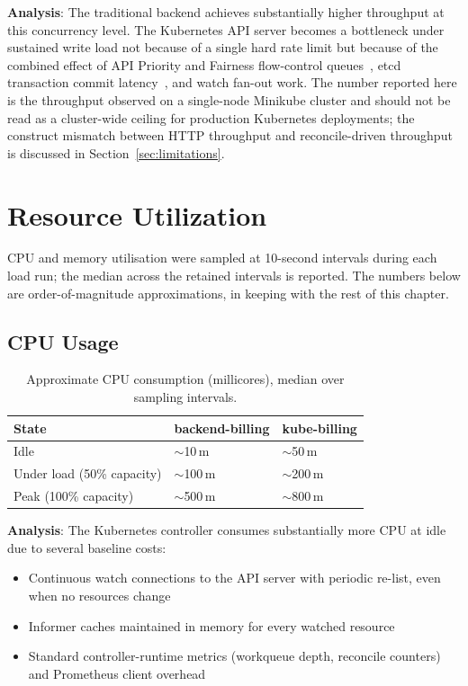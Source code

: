 \textbf{Analysis}: The traditional backend achieves substantially higher throughput at this concurrency level. The Kubernetes API server becomes a bottleneck under sustained write load not because of a single hard rate limit but because of the combined effect of API Priority and Fairness flow-control queues~\cite{k8s_apf}, etcd transaction commit latency~\cite{etcd_impact}, and watch fan-out work. The number reported here is the throughput observed on a single-node Minikube cluster and should not be read as a cluster-wide ceiling for production Kubernetes deployments; the construct mismatch between HTTP throughput and reconcile-driven throughput is discussed in Section~\ref{sec:limitations}.

\section{Resource Utilization}

CPU and memory utilisation were sampled at 10-second intervals during each load run; the median across the retained intervals is reported. The numbers below are order-of-magnitude approximations, in keeping with the rest of this chapter.

\subsection{CPU Usage}

\begin{table}[h]
\centering
\caption{Approximate CPU consumption (millicores), median over sampling intervals.}
\label{tab:cpu-usage}
\small\begin{tabularx}{\textwidth}{@{}lXX@{}}
\toprule
\textbf{State} & \textbf{backend-billing} & \textbf{kube-billing} \\ \midrule
Idle                       & $\sim$10\,m  & $\sim$50\,m  \\
Under load (50\% capacity) & $\sim$100\,m & $\sim$200\,m \\
Peak (100\% capacity)      & $\sim$500\,m & $\sim$800\,m \\ \bottomrule
\end{tabularx}
\end{table}

\textbf{Analysis}: The Kubernetes controller consumes substantially more CPU at idle due to several baseline costs:
\begin{itemize}
    \item Continuous watch connections to the API server with periodic re-list, even when no resources change~\cite{client_go}
    \item Informer caches maintained in memory for every watched resource~\cite{controller_runtime, ibryam2020}
    \item Standard controller-runtime metrics (workqueue depth, reconcile counters) and Prometheus client overhead
\end{itemize}

